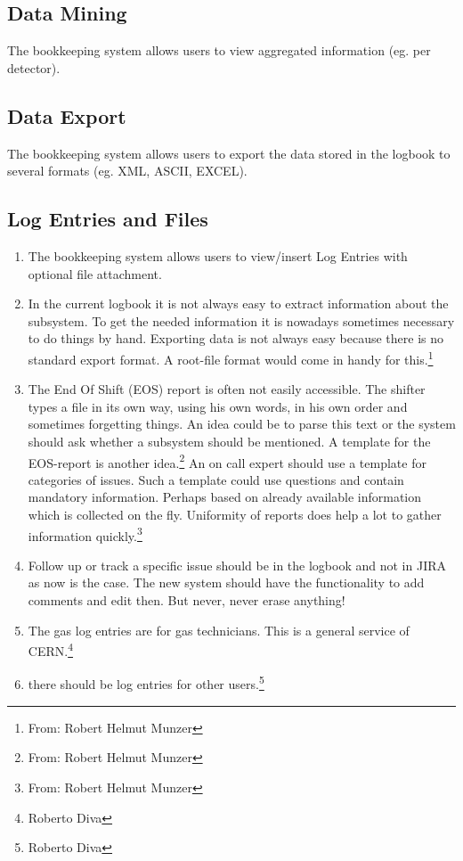 \subsection{Data Mining}
The bookkeeping system allows users to view aggregated information (eg. per detector).
\subsection{Data Export}
The bookkeeping system allows users to export the data stored in the logbook to several formats (eg. XML, ASCII, EXCEL).
\subsection{Log Entries and Files}
\begin{enumerate}
  \item The bookkeeping system allows users to view/insert Log Entries with optional file attachment.
  \item In the current logbook it is not always easy to extract information about the subsystem. To get the needed information it is nowadays sometimes necessary to do things by hand. Exporting data is not always easy because there is no standard export format. A root-file format would come in handy for this.\footnote{From: Robert Helmut Munzer}
  \item The End Of Shift (EOS) report is often not easily accessible. The shifter types a file in its own way, using his own words, in his own order and sometimes forgetting things. An idea could be to parse this text or the system should ask whether a subsystem should be mentioned. A template for the EOS-report is another idea.\footnote{From: Robert Helmut Munzer}
  An on call expert should use a template for categories of issues. Such a template could use questions and contain mandatory information. Perhaps based on already available information which is collected on the fly. Uniformity of reports does help a lot to gather information quickly.\footnote{From: Robert Helmut Munzer}
  \item Follow up or track a specific issue should be in the logbook and not in JIRA as now is the case. The new system should have the functionality to add comments and edit then. But never, never erase anything! 
  \item The gas log entries are for gas technicians. This is a general service of CERN.\footnote{Roberto Diva}
    \item there should be log entries for other users.\footnote{Roberto Diva}

\end{enumerate}
